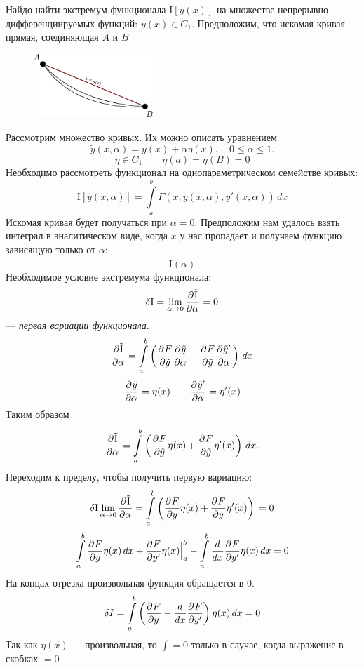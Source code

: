 Найдо найти экстремум функционала $\mathrm{I}[y(x)]$ на множестве непрерывно дифференциируемых функций: $y(x) \in C_1$.
Предположим, что искомая кривая --- прямая, соединяющая $A$ и $B$
\begin{figure}
	\centering
	\includegraphics[width=0.4\textwidth]{figVariaz2.pdf}
\end{figure}
Рассмотрим множество кривых. Их можно описать уравнением
\[
	\tilde y (x, \alpha) = y (x) + \alpha\eta(x), \quad 0 \leqslant \alpha \leqslant 1.
\]
\[
	\eta \in C_1 \qquad \eta(a) = \eta(B) = 0
\]
Необходимо рассмотреть функционал на однопараметрическом семействе кривых:
\[
	\mathrm{I}[\tilde y (x, \alpha)] = \int\limits_a^b F(x, \tilde y(x, \alpha), \tilde y'(x, \alpha)) \, dx
\]
Искомая кривая будет получаться при $\alpha = 0$. Предположим нам удалось взять интеграл в аналитическом виде, когда $x$ у нас пропадает и получаем функцию зависящую только от $\alpha$:
\[
	\tilde{\mathrm{I}}(\alpha)
\]
Необходимое условие экстремума функционала:
\[
	\delta \mathrm{I} = \lim\limits_{\alpha \to 0} \frac{\partial^{}\tilde{\mathrm{I}}}{\partial \alpha^{}} = 0 
\]
--- \textit{первая вариации функционала}.
\[
	\frac{\partial^{}\tilde{\mathrm{I}}}{\partial \alpha^{}} = \int\limits_a^b \left(\frac{\partial^{}F}{\partial \tilde y^{}} \frac{\partial^{}\tilde y}{\partial \alpha^{}} + \frac{\partial^{}F}{\partial \tilde y^{}} \frac{\partial^{}\tilde y'}{\partial \alpha^{}} \right)\, dx
\]
\[
	\frac{\partial^{}\tilde y}{\partial \alpha^{}} = \eta (x) \qquad \frac{\partial^{}\tilde y '}{\partial \alpha^{}} = \eta' (x)
\]
Таким образом 
\[
	\frac{\partial^{}\tilde{\mathrm{I}}}{\partial \alpha^{}} = \int\limits_a^b \left(\frac{\partial^{}F}{\partial \tilde y^{}} \eta (x) + \frac{\partial^{}F}{\partial \tilde y^{}} \eta'(x)\right)\, dx.
\]
Переходим к пределу, чтобы получить первую вариацию:
\[
	\delta \mathrm{I} \lim\limits_{\alpha \to 0} \frac{\partial^{}\tilde{\mathrm{I}}}{\partial \alpha^{}} = \int\limits_a^b \left(\frac{\partial^{}F}{\partial y^{}} \eta(x) + \frac{\partial^{}F}{\partial y^{}} \eta'(x)\right)\, = 0
\]
\[
	\int\limits_a^b \frac{\partial^{}F}{\partial y^{}} \eta(x)\, dx + \frac{\partial^{}F}{\partial y'^{}} \eta(x) \Big|_a^b - \int\limits_a^b \frac{d^{}}{dx^{}} \frac{\partial^{}F}{\partial y'^{}} \eta(x)\, dx = 0
\]
На концах отрезка произвольная функция обращается в 0.
\[
	\delta I = \int\limits_a^b \left(\frac{\partial^{}F}{\partial y^{}} - \frac{d^{}}{dx^{}} \frac{\partial^{}F}{\partial y'^{}} \right) \eta(x)\, dx = 0
\]
Так как $\eta(x)$ --- произвольная, то $\int = 0$ только в случае, когда выражение в скобках $= 0$\\

